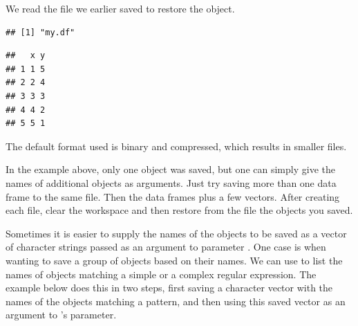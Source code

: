 \documentclass[krantz2]{krantz}\usepackage{knitr}
\begin{document}
We read the file we earlier saved to restore the object.

\begin{knitrout}\footnotesize
{}\color{fgcolor}\begin{kframe}
\begin{alltt}
\hlstd{(} \hlstd{=} \hlstd{)}
\hlstd{(} \hlstd{=} \hlstd{)}
\end{alltt}
\begin{verbatim}
## [1] "my.df"
\end{verbatim}
\begin{alltt}
\end{alltt}
\begin{verbatim}
##   x y
## 1 1 5
## 2 2 4
## 3 3 3
## 4 4 2
## 5 5 1
\end{verbatim}
\end{kframe}
\end{knitrout}

The default format used is binary and compressed, which results in smaller files.

\begin{playground}
In the example above, only one object was saved, but one can simply give the names of additional objects as arguments. Just try saving more than one data frame to the same file. Then the data frames plus a few vectors. After creating each file, clear the workspace and then restore from the file the objects you saved.
\end{playground}

Sometimes it is easier to supply the names of the objects to be saved as a vector of character strings passed as an argument to parameter . One case is when wanting to save a group of objects based on their names. We can use  to list the names of objects matching a simple  or a complex regular expression. The example below does this in two steps, first saving a character vector with the names of the objects matching a pattern, and then using this saved vector as an argument to 's  parameter.

\begin{knitrout}\footnotesize
{}\color{fgcolor}\begin{kframe}
\begin{alltt}
 \hlkwb{<-} \hlstd{(} \hlstd{=} \hlstd{)}
\hlstd{(}   \hlstd{=} \hlstd{)}
\end{alltt}
\end{kframe}
\end{knitrout}
\end{document}
